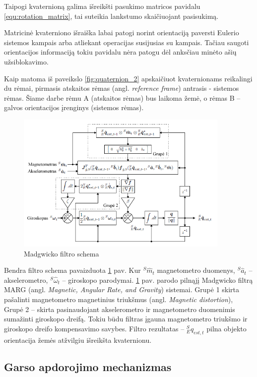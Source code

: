 \documentclass[]{vgtuef}
\begin{document}
Taipogi kvaternioną galima išreikšti pasukimo matricos pavidalu \ref{equ:rotation_matrix}, tai suteikia lankstumo skaičiuojant pasisukimą.

Matricinė kvaterniono išraiška labai patogi norint orientaciją paversti Eulerio sistemos kampais arba atliekant operacijas susijusias su kampais. Tačiau saugoti orientacijos informaciją tokiu pavidalu nėra patogu dėl anksčiau minėto ašių užsiblokavimo. 

Kaip matoma iš paveikslo \ref{fig:quaternion_2} apskaičiuot kvaternionams reikalingi du rėmai, pirmasis atskaitos rėmas (angl. \textit{reference frame}) antrasis - sistemos rėmas. Šiame darbe rėmu A (atskaitos rėmas) bus laikoma žemė, o rėmas B – galvos orientacijos įrenginys (sistemos rėmas).

\begin{figure}[htbp]
  \centering
  \includegraphics[width=390px]{img/madgwick.png}
  \caption{Madgwicko filtro schema}
  \label{fig:madgwick}
\end{figure}

Bendra filtro schema pavaizduota \ref{fig:madgwick} pav. Kur $^{S}\hat{m}_{t}$ magnetometro duomenys, $^{S}\hat{a}_{t}$ – akselerometro, $^{S}\hat{\omega}_{t}$  – giroskopo parodymai. \ref{fig:madgwick} pav. parodo pilnąjį Madgwicko filtrą MARG (angl. \textit{Magnetic, Angular Rate, and Gravity}) sistemai. Grupė 1 skirta pašalinti magnetometro magnetinius triukšmus (angl. \textit{Magnetic distortion}), Grupė 2 – skirta pasinaudojant akselerometro ir magnetometro duomenimis sumažinti giroskopo dreifą. Tokiu būdu filtras įgauna magnetometro triukšmo ir giroskopo dreifo kompensavimo savybes. Filtro rezultatas – $_{E}^{S}\hat{q}_{est,t}$ pilna objekto orientacija žemės atžvilgiu išreikšta kvaternionu. 

\subsection{Garso apdorojimo mechanizmas}
\end{document}
